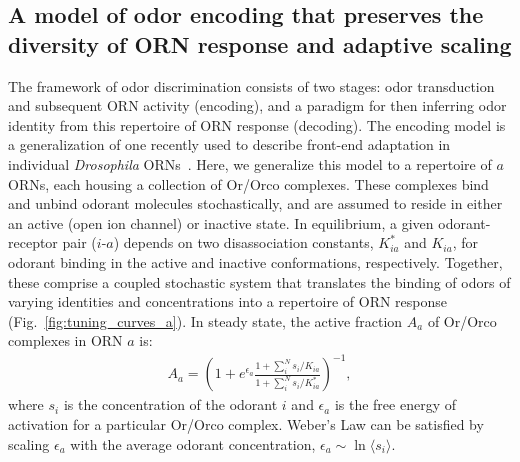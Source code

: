 \subsection{A model of odor encoding that preserves the diversity of ORN response and adaptive scaling}


The framework of odor discrimination consists of two stages: odor transduction and subsequent ORN activity (encoding), and a paradigm for then inferring odor identity from this repertoire of ORN response (decoding). The encoding model is a generalization of one recently used to describe front-end adaptation in individual \textit{Drosophila} ORNs~\cite{srinivas_elife}. %
Here, we generalize this model to a repertoire of $a$ ORNs, each housing a collection of Or/Orco complexes. These complexes bind and unbind odorant molecules stochastically, and are assumed to reside in either an active (open ion channel) or inactive state. In equilibrium, a given odorant-receptor pair ($i$-$a$) depends on two disassociation constants, $K^*_{ia}$ and $K_{ia}$, for odorant binding in the active and inactive conformations, respectively. Together, these comprise a coupled stochastic system that translates the binding of odors of varying identities and concentrations into a repertoire of ORN response (Fig.~\ref{fig:tuning_curves_a}). In steady state, the active fraction $ A_a$ of Or/Orco complexes in ORN $a$ is:
\begin{align}
A_a = \left(1 + e^{\epsilon_a}\frac{1 + \sum_i^N s_i/K_{ia}}{1 + \sum_i^N s_i/K^*_{ia}}\right)^{-1},
\label{eq:steady_state_act}
\end{align}
where $s_i$ is the concentration of the odorant $i$ and $\epsilon_a$ is the free energy of activation for a particular Or/Orco complex. %
Weber's Law can be satisfied by scaling $\epsilon_a$ with the average odorant concentration, $\epsilon_a \sim \ln \langle s_i \rangle$.%




